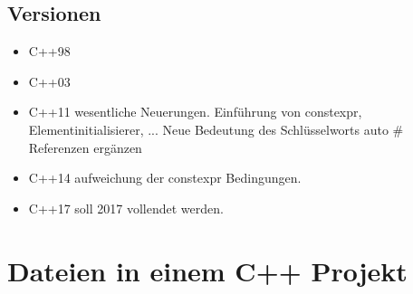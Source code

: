 \documentclass[a4paper]{report}
\theoremstyle{nonumberplain}
\begin{document}
\subsection{Versionen}
\begin{itemize}
	\item C++98
	\item C++03
	\item C++11
	\subitem wesentliche Neuerungen. Einführung von constexpr, Elementinitialisierer, ... Neue Bedeutung des Schlüsselworts auto \hspace{3cm} \# Referenzen ergänzen
	\item C++14
	\subitem aufweichung der constexpr Bedingungen.
	\item C++17
	\subitem soll 2017 vollendet werden.
\end{itemize}

\section{Dateien in einem C++ Projekt}
\end{document}
